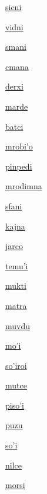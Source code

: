 {\hyperlink{val:sicni}{sicni}}{}{}{}

{\hyperlink{val:vidni}{vidni}}{}{}{}

{\hyperlink{val:smani}{smani}}{}{}{}

{\hyperlink{val:cmana}{cmana}}{}{}{}

{\hyperlink{val:derxi}{derxi}}{}{}{}

{\hyperlink{val:marde}{marde}}{}{}{}

{\hyperlink{val:batci}{batci}}{}{}{}

{\hyperlink{val:mrobiho}{mrobi'o}}{}{}{}

{\hyperlink{val:pinpedi}{pinpedi}}{}{}{}

{\hyperlink{val:mrodimna}{mrodimna}}{}{}{}

{\hyperlink{val:sfani}{sfani}}{}{}{}

{\hyperlink{val:kajna}{kajna}}{}{}{}

{\hyperlink{val:jarco}{jarco}}{}{}{}

{\hyperlink{val:temuhi}{temu'i}}{}{}{}

{\hyperlink{val:mukti}{mukti}}{}{}{}

{\hyperlink{val:matra}{matra}}{}{}{}

{\hyperlink{val:muvdu}{muvdu}}{}{}{}

{\hyperlink{val:mohi}{mo'i}}{}{}{}

{\hyperlink{val:sohiroi}{so'iroi}}{}{}{}

{\hyperlink{val:mutce}{mutce}}{}{}{}

{\hyperlink{val:pisohi}{piso'i}}{}{}{}

{\hyperlink{val:puzu}{puzu}}{}{}{}

{\hyperlink{val:sohi}{so'i}}{}{}{}

{\hyperlink{val:nilce}{nilce}}{}{}{}

{\hyperlink{val:morsi}{morsi}}{}{}{}

